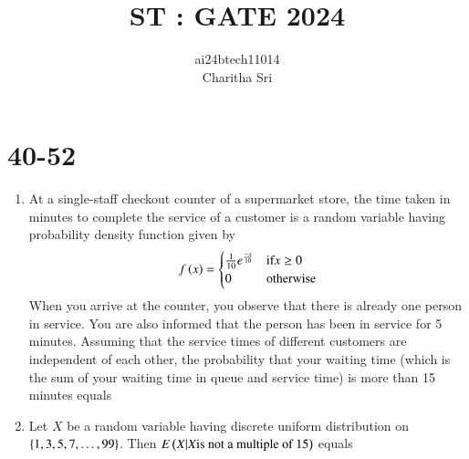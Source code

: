 \documentclass[journal,12pt,onecolumn]{IEEEtran}
\theoremstyle{remark}
\begin{document}

\vspace{3cm}

\title{ST : GATE 2024}
\author{ai24btech11014 \\ Charitha Sri}

\maketitle
\bigskip       
\renewcommand{\thefigure}{\theenumi}
\renewcommand{\thetable}{\theenumi}

\section{40-52}
\begin{enumerate}

\item At a single-staff checkout counter of a supermarket store, the time taken in minutes to complete the service of a customer is a random variable having probability density function given by
\begin{align}
f\left(x\right) = 
\begin{cases}
    \frac{1}{10} e^{\frac{-x}{10}}  & \text{if} x \geq 0 \\
    0 & \text{otherwise}
\end{cases}
    \end{align}
When you arrive at the counter, you observe that there is already one person in service. You are also informed that the person has been in service for 5 minutes. Assuming that the service times of different customers are independent of each other, the probability that your waiting time (which is the sum of your waiting time in queue and service time) is more than 15 minutes equals
\begin{enumerate}
\end{enumerate}

\item Let $X$ be a random variable having discrete uniform distribution on $\left\{1, 3, 5, 7, \dots, 99\right\}$. Then $E\left(X | X  \text{is not a multiple of 15}\right) $ equals
\begin{enumerate}
\end{enumerate}


\end{enumerate}
\end{document}
